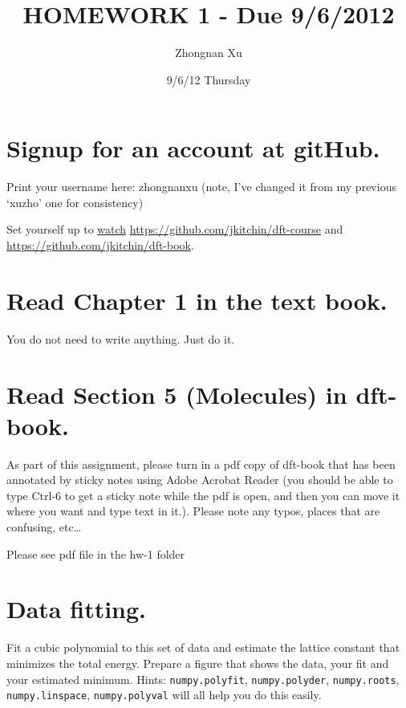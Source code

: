 \documentclass[11pt]{article}
\title{HOMEWORK 1 - Due 9/6/2012}
\author{Zhongnan Xu}
\date{9/6/12 Thursday}
\begin{document}
\maketitle

\setcounter{tocdepth}{3}
\tableofcontents
\vspace*{1cm}

\section{Signup for an account at gitHub.}
\label{sec-1}

Print your username here: zhongnanxu (note, I've changed it from my
previous `xuzho' one for consistency)

Set yourself up to \href{http://www.quora.com/GitHub/What-does-it-mean-to-watch-in-GitHub}{watch}
\href{https://github.com/jkitchin/dft-course}{https://github.com/jkitchin/dft-course} and
\href{https://github.com/jkitchin/dft-book}{https://github.com/jkitchin/dft-book}.
\section{Read Chapter 1 in the text book.}
\label{sec-2}

You do not need to write anything. Just do it.
\section{Read Section 5 (Molecules) in dft-book.}
\label{sec-3}

As part of this assignment, please turn in a pdf copy of dft-book that has been annotated by sticky notes using Adobe Acrobat Reader (you should be able to type Ctrl-6 to get a sticky note while the pdf is open, and then you can move it where you want and type text in it.). Please note any typos, places that are confusing, etc\ldots{}

Please see pdf file in the hw-1 folder
\section{Data fitting.}
\label{sec-4}

Fit a cubic polynomial to this set of data and estimate the lattice 
constant that minimizes the total energy. Prepare a figure that shows 
the data, your fit and your estimated minimum. Hints: \texttt{numpy.polyfit},
\texttt{numpy.polyder}, \texttt{numpy.roots}, \texttt{numpy.linspace}, \texttt{numpy.polyval} will 
all help you do this easily.
\end{document}
